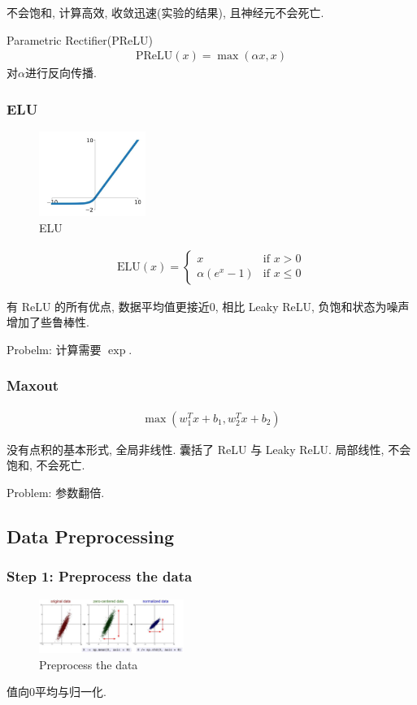 不会饱和, 计算高效, 收敛迅速(实验的结果), 且神经元不会死亡. 

Parametric Rectifier(PReLU)
\begin{align*}
    \text{PReLU}(x)=\max(\alpha x, x)
\end{align*}
对$\alpha$进行反向传播. 

\subsubsection{ELU}
\begin{figure}[!htb]
    \centering
    \includegraphics[width=0.309\textwidth]{pic/Lec6/ELU.png}
    \caption{ELU}
\end{figure}

\begin{align*}
    \text{ELU}(x)=\left\{ \begin{array}{ll}
        x & \text{if }x>0\\
        \alpha(e^x-1)&\text{if }x\le 0
    \end{array} \right.
\end{align*}

有 ReLU 的所有优点, 数据平均值更接近0, 相比 Leaky ReLU, 负饱和状态为噪声增加了些鲁棒性. 

Probelm: 计算需要 $\exp$. 

\subsubsection{Maxout}
\begin{align*}
    \max(w_1^Tx+b_1, w_2^Tx+b_2)
\end{align*}

没有点积的基本形式, 全局非线性. 囊括了 ReLU 与 Leaky ReLU. 局部线性, 不会饱和, 不会死亡. 

Problem: 参数翻倍. 

\subsection{Data Preprocessing}
\subsubsection{Step 1: Preprocess the data}
\begin{figure}[!htb]
    \centering
    \includegraphics[width=0.42\textwidth]{pic/Lec6/Preprocess the data}
    \caption{Preprocess the data}
\end{figure}
值向0平均与归一化. 


